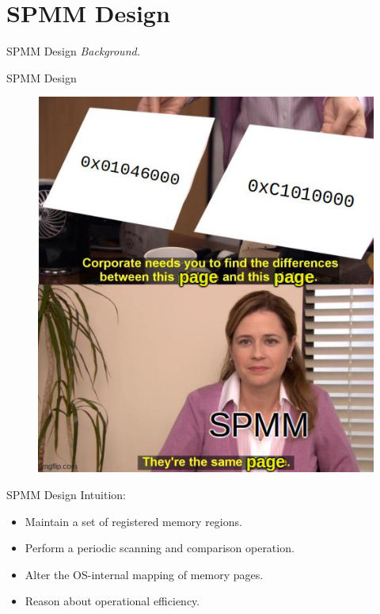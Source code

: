\section{SPMM Design}
\label{sec:design}

\begin{frame}{SPMM Design}
  \centering
  \emph{Background.}
\end{frame}

\begin{frame}{SPMM Design}
  \begin{figure}
    \centering
    \includegraphics[keepaspectratio,scale=0.32]{figures/same-page-meme}
  \end{figure}
\end{frame}

\begin{frame}{SPMM Design}
  Intuition:
  \begin{itemize}
    \item<2-> Maintain a set of registered memory regions.
    \item<3-> Perform a periodic scanning and comparison operation.
    \item<4-> Alter the OS-internal mapping of memory pages.
    \item<5-> Reason about operational efficiency.
  \end{itemize}
\end{frame}

